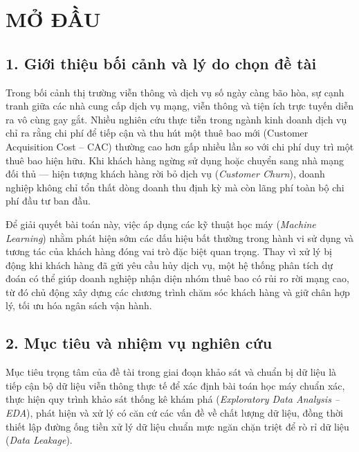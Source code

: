 \documentclass[a4paper]{article}
\begin{document}
\newpage
{}
\setcounter{page}{1}

\section*{\textbf{MỞ ĐẦU}}
{

\subsection*{\textbf{1. Giới thiệu bối cảnh và lý do chọn đề tài}}
Trong bối cảnh thị trường viễn thông và dịch vụ số ngày càng bão hòa, sự cạnh tranh giữa các nhà cung cấp dịch vụ mạng, viễn thông và tiện ích trực tuyến diễn ra vô cùng gay gắt. Nhiều nghiên cứu thực tiễn trong ngành kinh doanh dịch vụ chỉ ra rằng chi phí để tiếp cận và thu hút một thuê bao mới (Customer Acquisition Cost -- CAC) thường cao hơn gấp nhiều lần so với chi phí duy trì một thuê bao hiện hữu. Khi khách hàng ngừng sử dụng hoặc chuyển sang nhà mạng đối thủ --- hiện tượng khách hàng rời bỏ dịch vụ (\textit{Customer Churn}), doanh nghiệp không chỉ tổn thất dòng doanh thu định kỳ mà còn lãng phí toàn bộ chi phí đầu tư ban đầu.

Để giải quyết bài toán này, việc áp dụng các kỹ thuật học máy (\textit{Machine Learning}) nhằm phát hiện sớm các dấu hiệu bất thường trong hành vi sử dụng và tương tác của khách hàng đóng vai trò đặc biệt quan trọng. Thay vì xử lý bị động khi khách hàng đã gửi yêu cầu hủy dịch vụ, một hệ thống phân tích dự đoán có thể giúp doanh nghiệp nhận diện nhóm thuê bao có rủi ro rời mạng cao, từ đó chủ động xây dựng các chương trình chăm sóc khách hàng và giữ chân hợp lý, tối ưu hóa ngân sách vận hành.

\subsection*{\textbf{2. Mục tiêu và nhiệm vụ nghiên cứu}}
Mục tiêu trọng tâm của đề tài trong giai đoạn khảo sát và chuẩn bị dữ liệu là tiếp cận bộ dữ liệu viễn thông thực tế để xác định bài toán học máy chuẩn xác, thực hiện quy trình khảo sát thống kê khám phá (\textit{Exploratory Data Analysis -- EDA}), phát hiện và xử lý có căn cứ các vấn đề về chất lượng dữ liệu, đồng thời thiết lập đường ống tiền xử lý dữ liệu chuẩn mực ngăn chặn triệt để rò rỉ dữ liệu (\textit{Data Leakage}).

}
\end{document}
